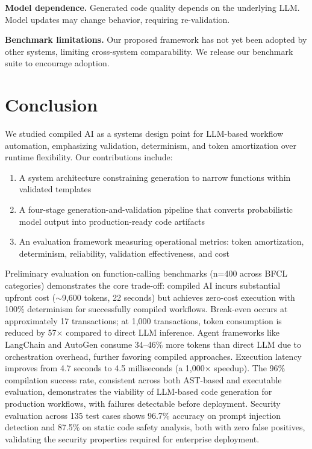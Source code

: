 \documentclass[11pt]{article}
\begin{document}
\textbf{Model dependence.} Generated code quality depends on the underlying LLM. Model updates may change behavior, requiring re-validation.

\textbf{Benchmark limitations.} Our proposed framework has not yet been adopted by other systems, limiting cross-system comparability. We release our benchmark suite to encourage adoption.

\section{Conclusion}
\label{sec:conclusion}

We studied compiled AI as a systems design point for LLM-based workflow automation, emphasizing validation, determinism, and token amortization over runtime flexibility. Our contributions include:

\begin{enumerate}
    \item A system architecture constraining generation to narrow functions within validated templates
    \item A four-stage generation-and-validation pipeline that converts probabilistic model output into production-ready code artifacts
    \item An evaluation framework measuring operational metrics: token amortization, determinism, reliability, validation effectiveness, and cost
\end{enumerate}

Preliminary evaluation on function-calling benchmarks (n=400 across BFCL categories) demonstrates the core trade-off: compiled AI incurs substantial upfront cost ($\sim$9,600 tokens, 22 seconds) but achieves zero-cost execution with 100\% determinism for successfully compiled workflows. Break-even occurs at approximately 17 transactions; at 1,000 transactions, token consumption is reduced by 57$\times$ compared to direct LLM inference. Agent frameworks like LangChain and AutoGen consume 34--46\% more tokens than direct LLM due to orchestration overhead, further favoring compiled approaches. Execution latency improves from 4.7 seconds to 4.5 milliseconds (a 1,000$\times$ speedup). The 96\% compilation success rate, consistent across both AST-based and executable evaluation, demonstrates the viability of LLM-based code generation for production workflows, with failures detectable before deployment. Security evaluation across 135 test cases shows 96.7\% accuracy on prompt injection detection and 87.5\% on static code safety analysis, both with zero false positives, validating the security properties required for enterprise deployment.
\end{document}
